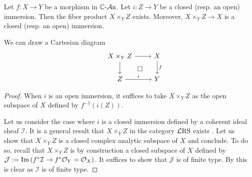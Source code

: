 \begin{lemma}\label{lma-existfiberproductimmersion}
    Let $f:X\rightarrow Y$ be a morphism in $\mathbb{C}\text{-}\mathcal{A}\mathrm{n}$. Let $i:Z\rightarrow Y$ be a closed (resp. an open) immersion. Then the fiber product $X\times_Y Z$ exists. Moreover, $X\times_Y Z\rightarrow X$ is a closed (resp. an open) immersion.
\end{lemma}
We can draw a Cartesian diagram
\[
    \begin{tikzcd}
        & X\times_Y Z \arrow[r]\arrow[d]\arrow[rd,"\square",phantom] & X \arrow[d,"f"]\\
        & Z  \arrow[r,"i"] & Y
    \end{tikzcd}
\]
\begin{proof}
    When $i$ is an open immersion, it suffices to take $X\times_Y Z$ as the open subspace of $X$ defined by $f^{-1}(i(Z))$.

    Let us consider the case where $i$ is a closed immersion defined by a coherent ideal sheaf $\mathcal{I}$. It is a general result that $X\times_Y Z$ in the category $\mathcal{L}\mathrm{RS}$ exists \cite[\href{https://stacks.math.columbia.edu/tag/01HQ}{Tag 01HQ}]{stacks-project}. Let us show that $X\times_Y Z$ is a closed complex analytic subspace of $X$ and conclude. To do so, recall that $X\times_Y Z$ is by construction a closed subspace of $X$ defined by $\mathcal{J}:=\operatorname{Im} \left(f^*\mathcal{I}\rightarrow f^*\mathcal{O}_Y=\mathcal{O}_X\right)$. It suffices to show that $\mathcal{J}$ is of finite type. By this is clear as $\mathcal{I}$ is of finite type.
\end{proof}

